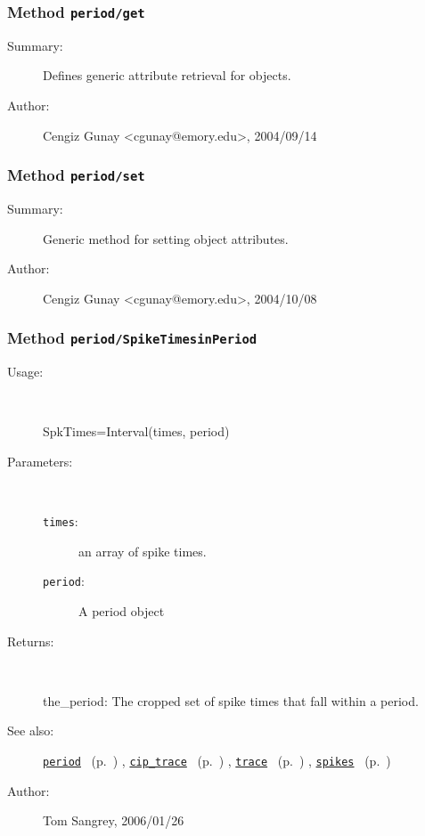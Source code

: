 \subsubsection[Method \texttt{get}]{Method \texttt{period/get}}%
%
\label{ref_period__get}%
\hypertarget{ref_period__get}{}%
\begin{description}
\item[Summary:]Defines generic attribute retrieval for objects.
%
%
%
%
%
%
%
\item[Author:]%
Cengiz Gunay <cgunay@emory.edu>, 2004/09/14
%
\end{description}
\methodline%
\subsubsection[Method \texttt{set}]{Method \texttt{period/set}}%
%
\label{ref_period__set}%
\hypertarget{ref_period__set}{}%
\begin{description}
\item[Summary:]Generic method for setting object attributes.
%
%
%
%
%
%
%
\item[Author:]%
Cengiz Gunay <cgunay@emory.edu>, 2004/10/08
%
\end{description}
\methodline%
\subsubsection[Method \texttt{SpikeTimesinPeriod}]{Method \texttt{period/SpikeTimesinPeriod}}%
%
\label{ref_period__SpikeTimesinPeriod}%
\hypertarget{ref_period__SpikeTimesinPeriod}{}%
\begin{description}
%
\item[Usage:]~%
\begin{lyxcode}%
SpkTimes=Interval(times, period)
%
\end{lyxcode}%
%
%
\item[Parameters:]~
\begin{description}%
\item[\texttt{times}:]
 an array of spike times.
\item[\texttt{period}:]
 A period object
\end{description}%
%
\item[Returns:
]~

	the\_period: The cropped set of spike times that fall within a period.
%
%
\item[See also:]%
\hyperlink{ref_period}{\texttt{period}}%
\ (p.~\pageref{ref_period})%
%
, \hyperlink{ref_cip_trace}{\texttt{cip\_trace}}%
\ (p.~\pageref{ref_cip_trace})%
%
, \hyperlink{ref_trace}{\texttt{trace}}%
\ (p.~\pageref{ref_trace})%
%
, \hyperlink{ref_spikes}{\texttt{spikes}}%
\ (p.~\pageref{ref_spikes})%
%
%
\item[Author:]%
Tom Sangrey, 2006/01/26
%
\end{description}
\methodline%
